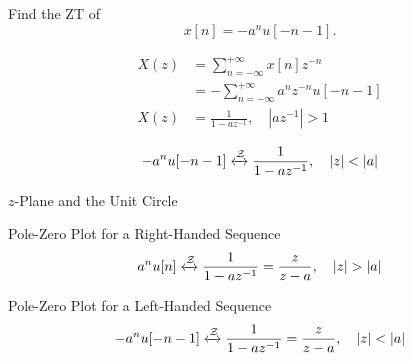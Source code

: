 \begin{frame}[t]{}
    \begin{example}
        Find the ZT of
        \begin{equation*}
            x[n] = -a^nu[-n-1].
        \end{equation*}
    \end{example}
    \pause
    {
            \begin{align*}
                X(z) &= \sum_{n=-\infty}^{+\infty}x[n]z^{-n}\\
                &= -\sum_{n=-\infty}^{+\infty}a^nz^{-n}u[-n-1]\\
                X(z) &= \frac{1}{1-az^{-1}}, \quad |az^{-1}|>1\\
            \end{align*}
            \pause
            \begin{equation*}
                -a^nu[-n-1] \xleftrightarrow{\mathcal{Z}}   \frac{1}{1-az^{-1}}, \quad |z|< |a|
            \end{equation*}

    }
\end{frame}


\begin{frame}{$z$-Plane and the Unit Circle}
    {
        \begin{center}
            
        \end{center}
    }
\end{frame}

\begin{frame}{Pole-Zero Plot for a Right-Handed Sequence}
    \begin{equation*}
        a^nu[n] \xleftrightarrow{\mathcal{Z}}   \frac{1}{1-az^{-1}} = \frac{z}{z-a}, \quad |z|> |a|
    \end{equation*}
    {
        \begin{center}
            
        \end{center}
    }
\end{frame}


\begin{frame}{Pole-Zero Plot for a Left-Handed Sequence}
    \begin{equation*}
        -a^nu[-n-1] \xleftrightarrow{\mathcal{Z}}   \frac{1}{1-az^{-1}} = \frac{z}{z-a},  \quad |z|< |a|
    \end{equation*}
    {
        \begin{center}
            
        \end{center}
    }
\end{frame}

